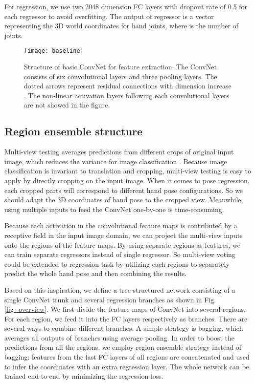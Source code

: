 \documentclass[10pt,twocolumn,letterpaper]{article}
\begin{document}
For regression, we use two 2048 dimension FC layers with dropout rate \cite{srivastava2014dropout} of 0.5 for each regressor to avoid overfitting. The output of regressor is a  vector representing the 3D world coordinates for hand joints, where  is the number of joints.

\begin{figure}[htb]
\centering
{\texttt{[image: baseline]}}
\caption{Structure of basic ConvNet for feature extraction. The ConvNet consists of six convolutional layers and three pooling layers. The dotted arrows represent residual connections with dimension increase \cite{he2015deep}. The non-linear activation layers following each convolutional layers are not showed in the figure.}
\label{fig_baseline}
\end{figure}

\subsection{Region ensemble structure}
\label{ensemble}
Multi-view testing averages predictions from different crops of original input image, which reduces the variance for image classification \cite{krizhevsky2012imagenet}. Because image classification is invariant to translation and cropping, multi-view testing is easy to apply by directly cropping on the input image. When it comes to pose regression, each cropped parts will correspond to different hand pose configurations. So we should adapt the 3D coordinates of hand pose to the cropped view. Meanwhile, using multiple inputs to feed the ConvNet one-by-one is time-consuming.

Because each activation in the convolutional feature maps is contributed by a receptive field in the input image domain, we can project the multi-view inputs onto the regions of the feature maps. By using separate regions as features, we can train separate regressors instead of single regressor. So multi-view voting could be extended to regression task by utilizing each regions to separately predict the whole hand pose and then combining the results.

Based on this inspiration, we define a tree-structured network consisting of a single ConvNet trunk and several regression branches as shown in Fig.\ref{fig_overview}. We first divide the feature maps of ConvNet into several regions. For each region, we feed it into the FC layers respectively as branches. There are several ways to combine different branches. A simple strategy is bagging, which averages all outputs of branches using average pooling. In order to boost the predictions from all the regions, we employ region ensemble strategy instead of bagging: features from the last FC layers of all regions are concatenated and used to infer the coordinates with an extra regression layer. The whole network can be trained end-to-end by minimizing the regression loss.
\end{document}
